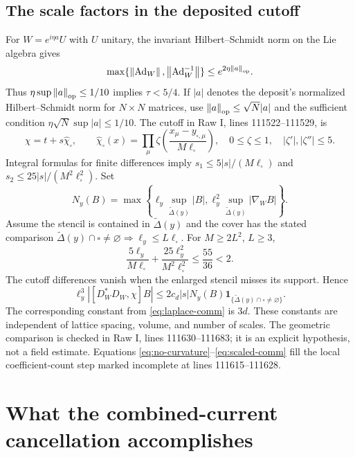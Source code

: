 \documentclass[11pt]{article}
\theoremstyle{remark}
\newcommand{\norm}[1]{\left\|#1\right\|}
\begin{document}
\subsection{The scale factors in the deposited cutoff}

For $W=e^{i\eta a}U$ with $U$ unitary, the invariant Hilbert--Schmidt
norm on the Lie algebra gives
\[
 \max\{\norm{\operatorname{Ad}_W},
          \norm{\operatorname{Ad}_W^{-1}}\}
 \le e^{2\eta\norm a_{\rm op}}.
\]
Thus $\eta\sup\norm a_{\rm op}\le1/10$ implies $\tau<5/4$.
If $|a|$ denotes the deposit's normalized Hilbert--Schmidt norm for
$N\times N$ matrices, use $\norm a_{\rm op}\le\sqrt N|a|$ and
the sufficient condition $\eta\sqrt N\sup|a|\le1/10$.
The cutoff in Raw I, lines 111522--111529, is
\[
 \chi=t+s\widehat\chi_\square,\qquad
 \widehat\chi_\square(x)=\prod_\mu
 \zeta\!\left(\frac{x_\mu-y_{\square,\mu}}{M\ell_\square}\right),
 \quad 0\le\zeta\le1,\quad |\zeta'|,|\zeta''|\le5.
\]
Integral formulas for finite differences imply
$s_1\le5|s|/(M\ell_\square)$ and
$s_2\le25|s|/(M^2\ell_\square^2)$.
Set
\[
 N_y(B)=\max\left\{
 \ell_y\sup_{\widetilde\Delta(y)}|B|,
 \ell_y^2\sup_{\widetilde\Delta(y)}|\nabla_W B|\right\}.
\]
Assume the stencil is contained in $\widetilde\Delta(y)$ and the
cover has the stated comparison
$\widetilde\Delta(y)\cap\square\ne\varnothing\Rightarrow
\ell_y\le L\ell_\square$. For $M\ge2L^2$, $L\ge3$,
\[
 \frac{5\ell_y}{M\ell_\square}
 +\frac{25\ell_y^2}{M^2\ell_\square^2}
 \le\frac{55}{36}<2.
\]
The cutoff differences vanish when the enlarged stencil misses its
support. Hence
\begin{equation}\label{eq:scaled-comm}
 \ell_y^3|[D_W^*D_W,\chi]B|
 \le2c_d|s|N_y(B)
 \mathbf1_{\{\widetilde\Delta(y)\cap\square\ne\varnothing\}}.
\end{equation}
The corresponding constant from \eqref{eq:laplace-comm} is $3d$.
These constants are independent of lattice spacing, volume, and number
of scales. The geometric comparison is checked in Raw I, lines
111630--111683; it is an explicit hypothesis, not a field estimate.
Equations \eqref{eq:no-curvature}--\eqref{eq:scaled-comm} fill the local
coefficient-count step marked incomplete at lines 111615--111628.

\section{What the combined-current cancellation accomplishes}
\end{document}
